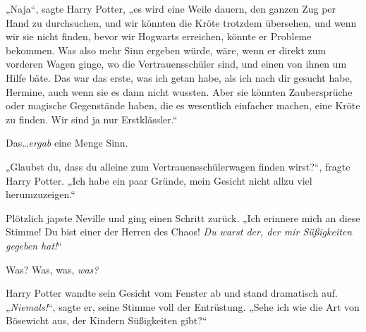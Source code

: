 „Naja“, sagte Harry Potter, „es wird eine Weile dauern, den ganzen Zug per Hand zu durchsuchen, und wir könnten die Kröte trotzdem übersehen, und wenn wir sie nicht finden, bevor wir Hogwarts erreichen, könnte er Probleme bekommen. Was also mehr Sinn ergeben würde, wäre, wenn er direkt zum vorderen Wagen ginge, wo die Vertrauensschüler sind, und einen von ihnen um Hilfe bäte. Das war das erste, was ich getan habe, als ich nach dir gesucht habe, Hermine, auch wenn sie es dann nicht wussten. Aber sie könnten Zaubersprüche oder magische Gegenstände haben, die es wesentlich einfacher machen, eine Kröte zu finden. Wir sind ja nur Erstklässler.“

Das…\emph{ergab} eine Menge Sinn.

„Glaubst du, dass du alleine zum Vertrauensschülerwagen finden wirst?“, fragte Harry Potter. „Ich habe ein paar Gründe, mein Gesicht nicht allzu viel herumzuzeigen.“

Plötzlich japste Neville und ging einen Schritt zurück. „Ich erinnere mich an diese Stimme! Du bist einer der Herren des Chaos! \emph{Du warst der, der mir Süßigkeiten gegeben hat!}“

Was? Was, was, \emph{was?}

Harry Potter wandte sein Gesicht vom Fenster ab und stand dramatisch auf. „\emph{Niemals!}“, sagte er, seine Stimme voll der Entrüstung. „Sehe ich wie die Art von Bösewicht aus, der Kindern Süßigkeiten gibt?“

